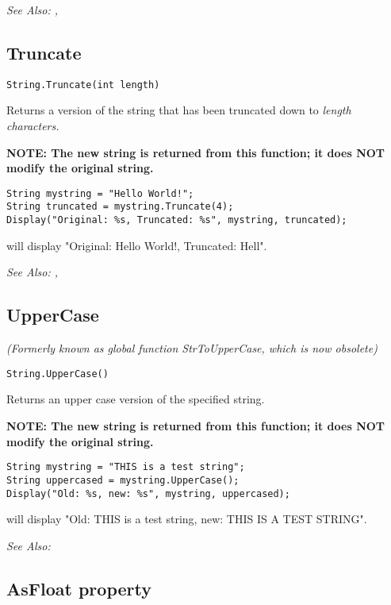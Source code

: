 \it{See Also:} , 


\subsection{Truncate}\label{String.Truncate}%

\begin{verbatim}
String.Truncate(int length)
\end{verbatim}
Returns a version of the string that has been truncated down to \it{length}
characters.

\bf{NOTE:} The new string is returned from this function; it
does \bf{NOT} modify the original string.

\begin{verbatim}
String mystring = "Hello World!";
String truncated = mystring.Truncate(4);
Display("Original: %s, Truncated: %s", mystring, truncated);
\end{verbatim}
will display "Original: Hello World!, Truncated: Hell".

\it{See Also:} , 


\subsection{UpperCase}\label{String.UpperCase}%

\it{(Formerly known as global function StrToUpperCase, which is now obsolete)}

\begin{verbatim}
String.UpperCase()
\end{verbatim}
Returns an upper case version of the specified string.

\bf{NOTE:} The new string is returned from this function; it
does \bf{NOT} modify the original string.

\begin{verbatim}
String mystring = "THIS is a test string";
String uppercased = mystring.UpperCase();
Display("Old: %s, new: %s", mystring, uppercased);
\end{verbatim}
will display "Old: THIS is a test string, new: THIS IS A TEST STRING".

\it{See Also:} 


\subsection{AsFloat property}\label{String.AsFloat}%

